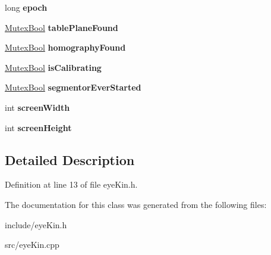 \begin{DoxyCompactItemize}
\item 
\hypertarget{classpersonal_robotics_1_1_eye_kin_a85285e7415be2ea06f94a8c857603613}{}long {\bfseries epoch}\label{classpersonal_robotics_1_1_eye_kin_a85285e7415be2ea06f94a8c857603613}

\item 
\hypertarget{classpersonal_robotics_1_1_eye_kin_a4af23689d80c4102000b41030a5c8b06}{}\hyperlink{classpersonal_robotics_1_1_mutex_type}{Mutex\+Bool} {\bfseries table\+Plane\+Found}\label{classpersonal_robotics_1_1_eye_kin_a4af23689d80c4102000b41030a5c8b06}

\item 
\hypertarget{classpersonal_robotics_1_1_eye_kin_a0f90b8527f9de27bc5bdd37bcf7be82d}{}\hyperlink{classpersonal_robotics_1_1_mutex_type}{Mutex\+Bool} {\bfseries homography\+Found}\label{classpersonal_robotics_1_1_eye_kin_a0f90b8527f9de27bc5bdd37bcf7be82d}

\item 
\hypertarget{classpersonal_robotics_1_1_eye_kin_a90ca304356ed45488ce8fb9b745c5ba1}{}\hyperlink{classpersonal_robotics_1_1_mutex_type}{Mutex\+Bool} {\bfseries is\+Calibrating}\label{classpersonal_robotics_1_1_eye_kin_a90ca304356ed45488ce8fb9b745c5ba1}

\item 
\hypertarget{classpersonal_robotics_1_1_eye_kin_a57b240362da5adbe6b57f17ecdfc4b01}{}\hyperlink{classpersonal_robotics_1_1_mutex_type}{Mutex\+Bool} {\bfseries segmentor\+Ever\+Started}\label{classpersonal_robotics_1_1_eye_kin_a57b240362da5adbe6b57f17ecdfc4b01}

\item 
\hypertarget{classpersonal_robotics_1_1_eye_kin_a2948bf30ea2e7059bf27478d40845de3}{}int {\bfseries screen\+Width}\label{classpersonal_robotics_1_1_eye_kin_a2948bf30ea2e7059bf27478d40845de3}

\item 
\hypertarget{classpersonal_robotics_1_1_eye_kin_a01bb34694b7f1bab38f44729c3c3364c}{}int {\bfseries screen\+Height}\label{classpersonal_robotics_1_1_eye_kin_a01bb34694b7f1bab38f44729c3c3364c}

\end{DoxyCompactItemize}


\subsection{Detailed Description}


Definition at line 13 of file eye\+Kin.\+h.



The documentation for this class was generated from the following files\+:\begin{DoxyCompactItemize}
\item 
include/eye\+Kin.\+h\item 
src/eye\+Kin.\+cpp\end{DoxyCompactItemize}
